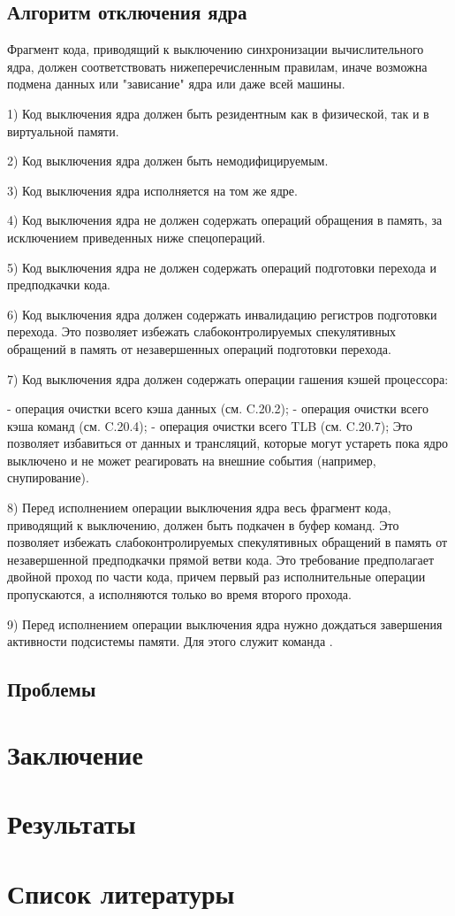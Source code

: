 \documentclass{article}
\begin{document}
\subsection{Алгоритм отключения ядра}

Фрагмент кода, приводящий к выключению синхронизации вычислительного ядра,
должен соответствовать нижеперечисленным правилам, иначе возможна подмена данных
или "зависание" ядра или даже всей машины.

1) Код выключения ядра должен быть резидентным как в физической, так и в виртуальной памяти.

2) Код выключения ядра должен быть немодифицируемым.

3) Код выключения ядра исполняется на том же ядре.

4) Код выключения ядра не должен содержать операций обращения в память, за
исключением приведенных ниже спецопераций.

5) Код выключения ядра не должен содержать операций подготовки перехода и
предподкачки кода.

6) Код выключения ядра должен содержать инвалидацию регистров подготовки
перехода. Это позволяет избежать слабоконтролируемых спекулятивных обращений в
память от незавершенных операций подготовки перехода.

7) Код выключения ядра должен содержать операции гашения кэшей процессора:

	- операция очистки всего кэша данных (см. C.20.2);
	       - операция очистки всего кэша команд (см. C.20.4);
	      - операция очистки всего TLB (см. C.20.7);
Это позволяет избавиться от данных и трансляций, которые могут устареть пока
ядро выключено и не может реагировать на внешние события (например,
снупирование).

8) Перед исполнением операции выключения ядра весь фрагмент кода, приводящий к
выключению, должен быть подкачен в буфер команд. Это позволяет избежать
слабоконтролируемых спекулятивных обращений в память от незавершенной
предподкачки прямой ветви кода. Это требование предполагает двойной проход по
части кода, причем первый раз исполнительные операции пропускаются, а
исполняются только во время второго прохода.

9) Перед исполнением операции выключения ядра нужно дождаться завершения
активности подсистемы памяти. Для этого служит команда {}.

\newpage


\subsection{Проблемы}

\newpage
\section{Заключение}

\section{Результаты}

\newpage
\section{Список литературы}
\end{document}
